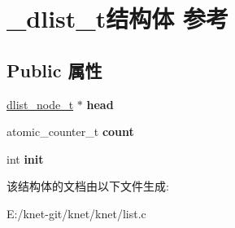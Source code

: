 \hypertarget{struct__dlist__t}{}\section{\+\_\+dlist\+\_\+t结构体 参考}
\label{struct__dlist__t}
\subsection*{Public 属性}
\begin{DoxyCompactItemize}
\item 
\hypertarget{struct__dlist__t_a0977afbac05b99991386bb9bd75a6fe2}{}\hyperlink{struct__dlist__node__t}{dlist\+\_\+node\+\_\+t} $\ast$ {\bfseries head}\label{struct__dlist__t_a0977afbac05b99991386bb9bd75a6fe2}

\item 
\hypertarget{struct__dlist__t_aa38de0ef086624e66baf0aa28accb45f}{}atomic\+\_\+counter\+\_\+t {\bfseries count}\label{struct__dlist__t_aa38de0ef086624e66baf0aa28accb45f}

\item 
\hypertarget{struct__dlist__t_a3de2609af755cf6408f8d450b9bd7252}{}int {\bfseries init}\label{struct__dlist__t_a3de2609af755cf6408f8d450b9bd7252}

\end{DoxyCompactItemize}


该结构体的文档由以下文件生成\+:\begin{DoxyCompactItemize}
\item 
E\+:/knet-\/git/knet/knet/list.\+c\end{DoxyCompactItemize}
